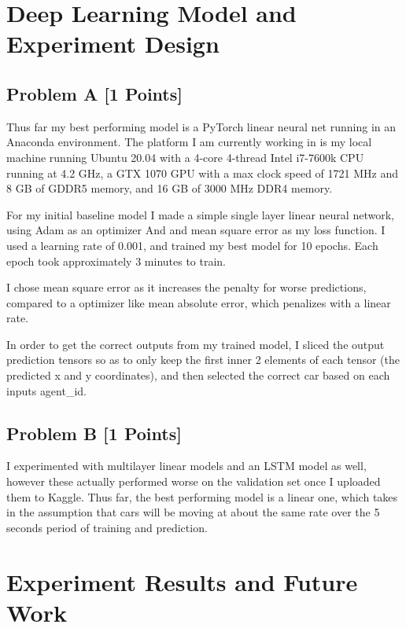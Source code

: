 \documentclass{article}
\begin{document}
\section{Deep Learning Model and Experiment Design}
\label{gen_inst}
    \subsection{Problem A [1 Points]}
        Thus far my best performing model is a PyTorch linear neural net running in an Anaconda environment.
        The platform I am currently working in is my local machine running Ubuntu 20.04 with a 4-core 4-thread Intel i7-7600k CPU 
        running at 4.2 GHz, a GTX 1070 GPU with a max clock speed of 1721 MHz and 8 GB of GDDR5 memory, and 16 GB of 3000 MHz DDR4 memory.
        
        For my initial baseline model I made a simple single layer linear neural network, using Adam as an optimizer And
        and mean square error as my loss function. I used a learning rate of 0.001, and  trained my best model for
        10 epochs. Each epoch took approximately 3 minutes to train.

        I chose mean square error as it increases the penalty for worse predictions, compared to a optimizer like
        mean absolute error, which penalizes with a linear rate. 
        
        In order to get the correct outputs from my trained model, I sliced the output prediction tensors so as to only
        keep the first inner 2 elements of each tensor (the predicted x and y coordinates), and then selected the correct car based on
        each inputs  {\selectfont agent\_id}.

    \subsection{Problem B [1 Points]}        

        I experimented with multilayer linear models and an LSTM model as well, however these actually performed worse on 
        the validation set once I uploaded them to Kaggle. Thus far, the best performing model is a linear one, which
        takes in the assumption that cars will be moving at about the same rate over the 5 seconds period of training and prediction.


\section{Experiment Results and Future Work}
\label{headings}
\end{document}
